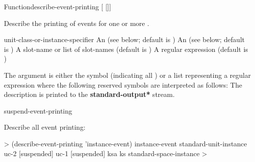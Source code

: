 \documentclass[10pt,twoside,english,pdftex]{article}
\begin{document}

\begin{functiondoc}{Function}{describe-event-printing}%
  {[ 
    []] \\
     }
%
%


\fnsyntax

\fnpurpose Describe the printing of events for one or more
. 

\fnpackage {}

\fnmodule {}

\fnargs
\begin{args}{unit-class-or-instance-specifier}
 An  
(see below; default is )
 An 
(see below; default is )
 A slot-name or list of
slot-names (default is )
 A  regular
expression (default is \code{(*)})
\end{args}

\fndsyntax
\W\supp\tabletop
\eventclassspec
\subeventingspec
\syntaxsep
\unitclassinstancespec
\subclassingspec

\fndescription 
{}%
The  argument is either the symbol  (indicating
all ) or a list representing a regular
expression where the following reserved symbols are interpreted as
follows:
\spaceinstanceregexp
The description is printed to the {\bf *standard-output*} stream.

\begin{alsos}{suspend-event-printing}
\end{alsos}

\fnexample
Describe all event printing:
%
\W\supp
\begin{example}
  > (describe-event-printing 'instance-event)
  instance-event
    standard-unit-instance
    uc-2 [suspended]
    uc-1 [suspended]
    ksa
    ks
    standard-space-instance
  >
\end{example}

\fnnote
\instanceevfnsnyi

\end{functiondoc}
\end{document}
